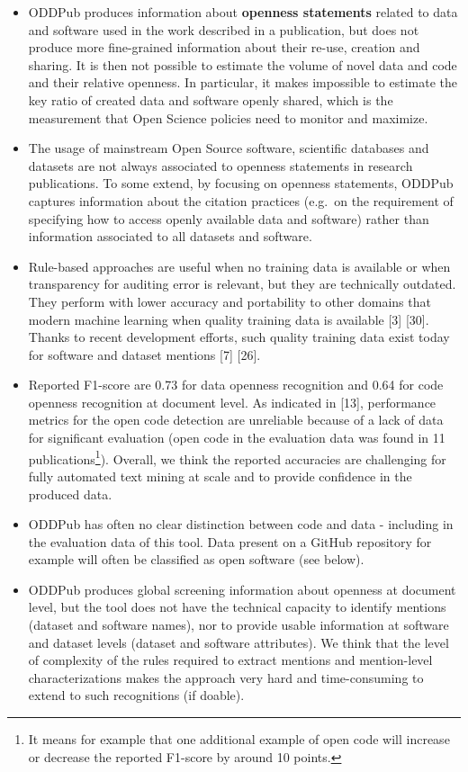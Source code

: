 \documentclass[
]{article}
\begin{document}
\begin{itemize}
\item
  ODDPub produces information about \textbf{openness statements} related
  to data and software used in the work described in a publication, but
  does not produce more fine-grained information about their re-use,
  creation and sharing. It is then not possible to estimate the volume
  of novel data and code and their relative openness. In particular, it
  makes impossible to estimate the key ratio of created data and
  software openly shared, which is the measurement that Open Science
  policies need to monitor and maximize.
\item
  The usage of mainstream Open Source software, scientific databases and
  datasets are not always associated to openness statements in research
  publications. To some extend, by focusing on openness statements,
  ODDPub captures information about the citation practices (e.g.~on the
  requirement of specifying how to access openly available data and
  software) rather than information associated to all datasets and
  software.
\end{itemize}

\begin{itemize}
\item
  Rule-based approaches are useful when no training data is available or
  when transparency for auditing error is relevant, but they are
  technically outdated. They perform with lower accuracy and portability
  to other domains that modern machine learning when quality training
  data is available {[}3{]} {[}30{]}. Thanks to recent development
  efforts, such quality training data exist today for software and
  dataset mentions {[}7{]} {[}26{]}.
\item
  Reported F1-score are 0.73 for data openness recognition and 0.64 for
  code openness recognition at document level. As indicated in {[}13{]},
  performance metrics for the open code detection are unreliable because
  of a lack of data for significant evaluation (open code in the
  evaluation data was found in 11 publications\footnote{It means for
    example that one additional example of open code will increase or
    decrease the reported F1-score by around 10 points.}). Overall, we
  think the reported accuracies are challenging for fully automated text
  mining at scale and to provide confidence in the produced data.
\item
  ODDPub has often no clear distinction between code and data -
  including in the evaluation data of this tool. Data present on a
  GitHub repository for example will often be classified as open
  software (see below).
\item
  ODDPub produces global screening information about openness at
  document level, but the tool does not have the technical capacity to
  identify mentions (dataset and software names), nor to provide usable
  information at software and dataset levels (dataset and software
  attributes). We think that the level of complexity of the rules
  required to extract mentions and mention-level characterizations makes
  the approach very hard and time-consuming to extend to such
  recognitions (if doable).
\end{itemize}
\end{document}

